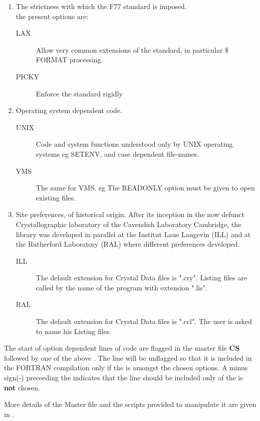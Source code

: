 \begin{enumerate}
\item The strictness with which the F77 standard is imposed.\\
the present options are:
\begin{description}
\item[LAX] Allow very common extensions of the standard, in particular \$
FORMAT processing.
\item[PICKY] Enforce the standard rigidly
\end{description}
\item Operating system dependent code.
\begin{description}
\item[UNIX] Code and system functions understood only by UNIX operating 
systems eg SETENV, and case dependent file-names.
\item[VMS] The same for VMS. eg The READONLY option must be given to open
existing files.
\end{description}  
\item Site preferences, of historical origin. After its inception in the
now defunct Crystallographic laboratory of the Cavendish Laboratory Cambridge, 
the library was developed in parallel at the Institut Laue Langevin 
(ILL) and at the Rutherford Laboratory (RAL) where different preferences
developed.
\begin{description}
\item[ILL] The default extension for Crystal Data files is ".cry". Listing files
are called by the name of the program with extension ".lis".
\item[RAL] The default extension for Crystal Data files is ".ccl". The user
is asked to name his Listing files.
\end{description}
\end{enumerate}
The start of option dependent lines of code are flagged in the master file 
{\bf CS} followed by one of
the above . The line will be unflagged so that
it is included in the FORTRAN compilation only if the  is amongst the
chosen options. A minus sign(-) preceeding the  indicates that
the line should be included only of the  is {\bf not} chosen.
\par 
More details of the Master file and the scripts provided to manipulate it are
given in . 
\p
